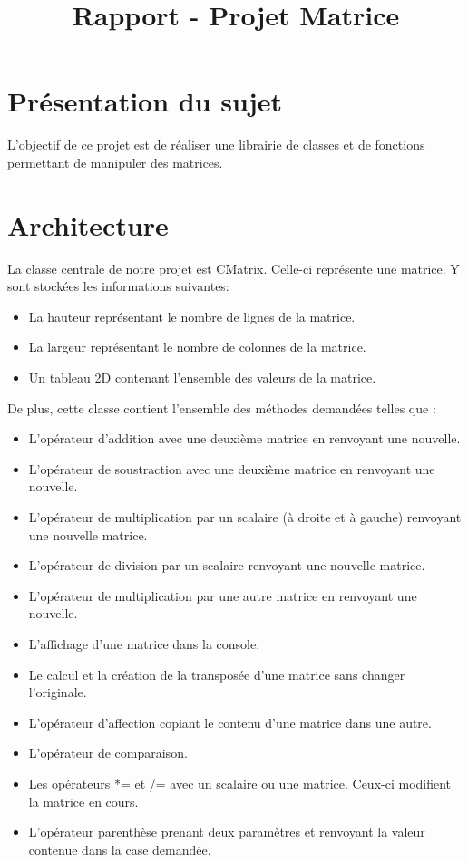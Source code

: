 
\title{Rapport - Projet Matrice}
\fancyhf{}
\lhead{\leftmark}


	\maketitle
	\tableofcontents
	\chapter{Présentation du sujet}
		L'objectif de ce projet est de réaliser une librairie de classes et de fonctions permettant de manipuler des matrices.
	
	\chapter{Architecture}
		La classe centrale de notre projet est CMatrix. Celle-ci représente une matrice. Y sont stockées les informations suivantes:
		\begin{itemize}
			\item La hauteur représentant le nombre de lignes de la matrice.
			\item La largeur représentant le nombre de colonnes de la matrice.
			\item Un tableau 2D contenant l'ensemble des valeurs de la matrice.\\
		\end{itemize}
		De plus, cette classe contient l'ensemble des méthodes demandées telles que :
		\begin{itemize}
			\item L'opérateur d'addition avec une deuxième matrice en renvoyant une nouvelle.
			\item L'opérateur de soustraction avec une deuxième matrice en renvoyant une nouvelle.
			\item L'opérateur de multiplication par un scalaire (à droite et à gauche) renvoyant une nouvelle matrice.
			\item L'opérateur de division par un scalaire renvoyant une nouvelle matrice.
			\item L'opérateur de multiplication par une autre matrice en renvoyant une nouvelle.
			\item L'affichage d'une matrice dans la console.
			\item Le calcul et la création de la transposée d'une matrice sans changer l'originale.
			\item L'opérateur d'affection copiant le contenu d'une matrice dans une autre.
			\item L'opérateur de comparaison.
			\item Les opérateurs *= et /= avec un scalaire ou une matrice. Ceux-ci modifient la matrice en cours.
			\item L'opérateur parenthèse prenant deux paramètres et renvoyant la valeur contenue dans la case demandée.\\
		\end{itemize}
		
